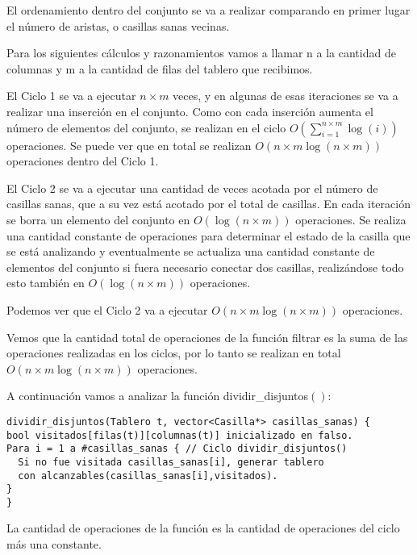 \documentclass[a4paper, 12pt] {article}
\begin{document}
El ordenamiento dentro del conjunto se va a realizar comparando en primer lugar el n\'umero de aristas, o casillas sanas vecinas.


Para los siguientes c\'alculos y razonamientos vamos a llamar n a la cantidad de columnas y m a la cantidad de filas del tablero que recibimos.


El Ciclo 1 se va a ejecutar $n\times m $ veces, y en algunas de esas iteraciones se va a realizar una inserci\'on en el conjunto. Como con cada inserci\'on aumenta el n\'umero de elementos del conjunto, se realizan en el ciclo $O\left( \textstyle\sum_{i=1}^{n\times m} \log\left( i\right) \right) $ operaciones. Se puede ver que en total se realizan $ O\left( n\times m \log\left( n\times m\right) \right) $ operaciones dentro del Ciclo 1.


El Ciclo 2 se va a ejecutar una cantidad de veces acotada por el n\'umero de casillas sanas, que a su vez est\'a acotado por el total de casillas. En cada iteraci\'on se borra un elemento del conjunto en $O\left( \log\left( n\times m \right) \right) $ operaciones. Se realiza una cantidad constante de operaciones para determinar el estado de la casilla que se est\'a analizando y eventualmente se actualiza una cantidad constante de elementos del conjunto si fuera necesario conectar dos casillas, realiz\'andose todo esto tambi\'en en $O\left( \log\left( n\times m\right) \right) $ operaciones. 


Podemos ver que el Ciclo 2 va a ejecutar $O\left( n\times m \log\left( n\times m\right) \right) $ operaciones.

Vemos que la cantidad total de operaciones de la funci\'on filtrar es la suma de las operaciones realizadas en los ciclos, por lo tanto se realizan en total $O\left( n\times m \log\left( n\times m\right) \right) $ operaciones.


A continuaci\'on vamos a analizar la funci\'on dividir\_disjuntos$\left( \right) $:

\begin{verbatim}
dividir_disjuntos(Tablero t, vector<Casilla*> casillas_sanas) {
bool visitados[filas(t)][columnas(t)] inicializado en falso.
Para i = 1 a #casillas_sanas { // Ciclo dividir_disjuntos()
  Si no fue visitada casillas_sanas[i], generar tablero
  con alcanzables(casillas_sanas[i],visitados).
}
}
\end{verbatim}

La cantidad de operaciones de la funci\'on es la cantidad de operaciones del ciclo m\'as una constante. 
\end{document}
